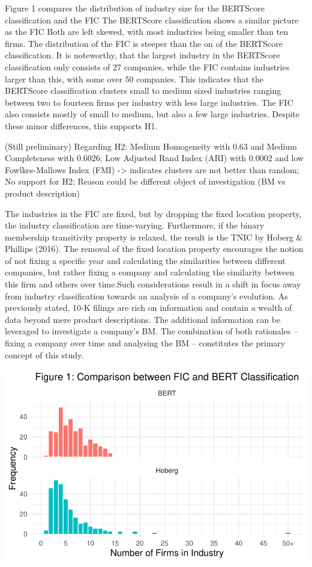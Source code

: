 \documentclass[
]{article}
\begin{document}
Figure 1 compares the distribution of industry size for the BERTScore
classification and the FIC The BERTScore classification shows a similar
picture as the FIC Both are left skewed, with most industries being
smaller than ten firms. The distribution of the FIC is steeper than the
on of the BERTScore classification. It is noteworthy, that the largest
industry in the BERTScore classification only consists of 27 companies,
while the FIC contains industries larger than this, with some over 50
companies. This indicates that the BERTScore classification clusters
small to medium sized industries ranging between two to fourteen firms
per industry with less large industries. The FIC also consists mostly of
small to medium, but also a few large industries. Despite these minor
differences, this supports H1.

(Still preliminary) Regarding H2: Medium Homogeneity with 0.63 and
Medium Completeness with 0.6026; Low Adjusted Rand Index (ARI) with
0.0002 and low Fowlkes-Mallows Index (FMI) -\textgreater{} indicates
clusters are not better than random; No support for H2; Reason could be
different object of investigation (BM vs product description)

The industries in the FIC are fixed, but by dropping the fixed location
property, the industry classification are time-varying. Furthermore, if
the binary membership transitivity property is relaxed, the result is
the TNIC by Hoberg \& Phillips (2016). The removal of the fixed location
property encourages the notion of not fixing a specific year and
calculating the similarities between different companies, but rather
fixing a company and calculating the similarity between this firm and
others over time.Such considerations result in a shift in focus away
from industry classification towards an analysis of a company's
evolution. As previously stated, 10-K filings are rich on information
and contain a wealth of data beyond mere product descriptions. The
additional information can be leveraged to investigate a company's BM.
The combination of both rationales -- fixing a company over time and
analysing the BM -- constitutes the primary concept of this study.

\includegraphics{ProjectEcoDataScience_files/figure-pdf/unnamed-chunk-4-1.pdf}
\end{document}
